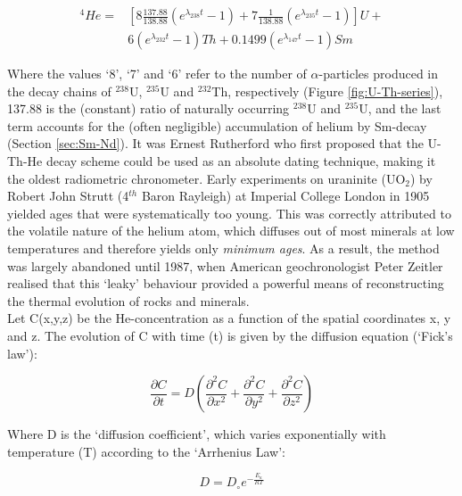 \documentclass{book}
\begin{document}
\begin{equation}
\begin{array}{rl}
^4He = & \left[8 \frac{137.88}{138.88} (e^{\lambda_{238}t} - 1) + 7 \frac{1}{138.88} (e^{\lambda_{235}t} - 1) \right] U +\\
~ & 6 (e^{\lambda_{232}t} - 1) Th + 0.1499 (e^{\lambda_{147}t} - 1) Sm
\end{array}
\label{eq:U-Th-He}
\end{equation}

Where the values `8', `7' and `6' refer to the number of
$\alpha$-particles produced in the decay chains of $^{238}$U,
$^{235}$U and $^{232}$Th, respectively (Figure \ref{fig:U-Th-series}),
137.88 is the (constant) ratio of naturally occurring $^{238}$U and
$^{235}$U, and the last term accounts for the (often negligible)
accumulation of helium by Sm-decay (Section \ref{sec:Sm-Nd}). It was
Ernest Rutherford who first proposed that the U-Th-He decay scheme
could be used as an absolute dating technique, making it the oldest
radiometric chronometer. Early experiments on uraninite (UO$_2$) by
Robert John Strutt (4$^{th}$ Baron Rayleigh) at Imperial College
London in 1905 yielded ages that were systematically too young. This
was correctly attributed to the volatile nature of the helium atom,
which diffuses out of most minerals at low temperatures and therefore
yields only \emph{minimum ages}. As a result, the method was largely
abandoned until 1987, when American geochronologist Peter Zeitler
realised that this `leaky' behaviour provided a powerful means of
reconstructing the thermal evolution of rocks and minerals. \\

Let C(x,y,z) be the He-concentration as a function of the spatial
coordinates x, y and z.  The evolution of C with time (t) is given by
the diffusion equation (`Fick's law'):

\begin{equation}
\frac{\partial C}{\partial t} = D \left(
\frac{\partial^2C}{\partial x^2} + \frac{\partial^2C}{\partial y^2} +
\frac{\partial^2C}{\partial z^2}\right)
\label{eq:fick}
\end{equation}

Where D is the `diffusion coefficient', which varies exponentially
with temperature (T) according to the `Arrhenius Law':

\begin{equation}
D = D_\circ e^{-\frac{E_a}{RT}}
\label{eq:Arrhenius}
\end{equation}
\end{document}
